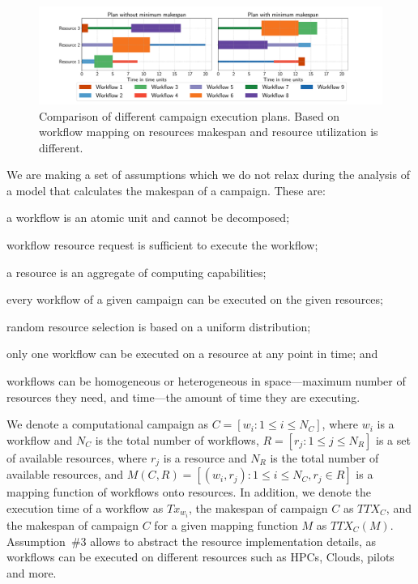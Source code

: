 \begin{figure}[ht!]
    \centering
    \includegraphics[width=.99\textwidth]{figures/campaign/plan_comp.pdf}
    \caption{Comparison of different campaign execution plans. Based on workflow mapping on resources makespan and resource utilization is different.}\label{fig:example_makespan}
\end{figure}

We are making a set of assumptions which we do not relax during the analysis of a model that calculates the makespan of a campaign.
These are:
\begin{inparaenum}[(1)]
    \item a workflow is an atomic unit and cannot be decomposed;
    \item workflow resource request is sufficient to execute the workflow;
    \item a resource is an aggregate of computing capabilities;
    \item every workflow of a given campaign can be executed on the given resources;
    \item random resource selection is based on a uniform distribution;
    \item only one workflow can be executed on a resource at any point in time; and
    \item workflows can be homogeneous or heterogeneous in space---maximum number of resources they need, and time---the amount of time they are executing.
\end{inparaenum}

We denote a computational campaign as $C = [w_{i}: 1 \leq i \leq N_{C}]$, where $w_{i}$ is a workflow and $N_{C}$ is the total number of workflows, $R = [ r_{j}: 1 \leq j \leq N_{R}]$ is a set of available resources, where $r_{j}$ is a resource and $N_{R}$ is the total number of available resources, and $ M(C,R) = [(w_i, r_j): 1 \leq i \leq N_{C}, r_j \in R] $ is a mapping function of workflows onto resources.
In addition, we denote the execution time of a workflow as $Tx_{w_{i}}$, the makespan of campaign $C$ as $TTX_{C}$, and the makespan of campaign $C$ for a given mapping function $ M $ as $TTX_{C}(M)$.
Assumption~\#3 allows to abstract the resource implementation details, as workflows can be executed on different resources such as HPCs, Clouds, pilots and more. 

